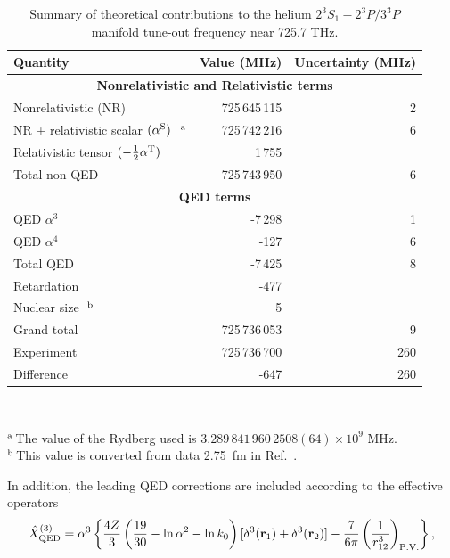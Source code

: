 \documentclass[%
 amsmath,amssymb,
aps,
]{revtex4-2}
\newcommand{\MetastableState}{2^{3\!}S_1}%
\newcommand{\UpperStateManifold}{3^{3\!}P}%
\newcommand{\LowerStateManifold}{2^{3\!}P}%
\newcommand{\TO}{\MetastableState- \LowerStateManifold / \UpperStateManifold}%
\begin{document}
\begin{table}[t]
\caption{\label{tab:theory}Summary of theoretical contributions to the helium $\TO$ manifold tune-out frequency near 725.7 THz.}
\begin{ruledtabular}
\begin{tabular}{l r r}
Quantity    &Value (MHz) & Uncertainty (MHz) \\
\hline
\multicolumn{3}{c}{\textbf{Nonrelativistic and Relativistic terms}} \\
Nonrelativistic (NR) & 725\,645\,115& 2       \\
NR + relativistic scalar $(\alpha^{\rm S})$ $^{\rm\ a}$    & 725\,742\,216&6   \\
Relativistic tensor $(-\frac12\alpha^{\rm T})$ &   1\,755& \\
\hline
Total non-QED        & 725\,743\,950&6     \\
\hline
\multicolumn{3}{c}{\textbf{QED terms}} \\
QED $\alpha^3$       &       -7\,298& 1       \\
QED $\alpha^4$       &          -127& 6       \\
\hline
Total QED            &         -7\,425& 8     \\
\hline
Retardation          &          -477 &        \\
Nuclear size $^{\rm\ b}$         &             5&          \\
\hline
Grand total          & 725\,736\,053& 9       \\
Experiment           & 725\,736\,700& 260 \\
\hline
Difference           &          -647& 260\\
\end{tabular}\\
\end{ruledtabular}
$^{\rm a\,}$The value of the Rydberg used is $3.289\,841\,960\,2508(64)\times10^9$ MHz.  \\
$^{\rm b\,}$This value is converted from data 2.75~fm in Ref.~\cite{PhysRevA.99.040502}.
\end{table}
In addition, the leading QED corrections are included according to the effective operators \cite{Yerokhin2010}
\begin{equation}
\hat{X}_{\rm QED}^{(3)} = \alpha^3\left\{\frac{4Z}{3}\left(\frac{19}{30} - \ln\alpha^2 -
\ln k_0\right)[\delta^3({\bf r}_1) + \delta^3({\bf r}_2)]
 - \frac{7}{6\pi}\left(\frac{1}{r_{12}^3}\right)_{\rm P.V.}\right\},
\end{equation}
\end{document}
